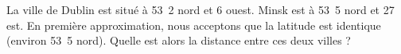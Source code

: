 
\begin{exercice}\label{exosmath-0469}

    La ville de Dublin est situé à \unit{53.2}{\degree} nord et \unit{6}{\degree} ouest. Minsk est à \unit{53.5}{\degree} nord et \unit{27}{\degree} est. En première approximation, nous acceptons que la latitude est identique (environ \unit{53.5}{\degree} nord). Quelle est alors la distance entre ces deux villes ?

\end{exercice}
